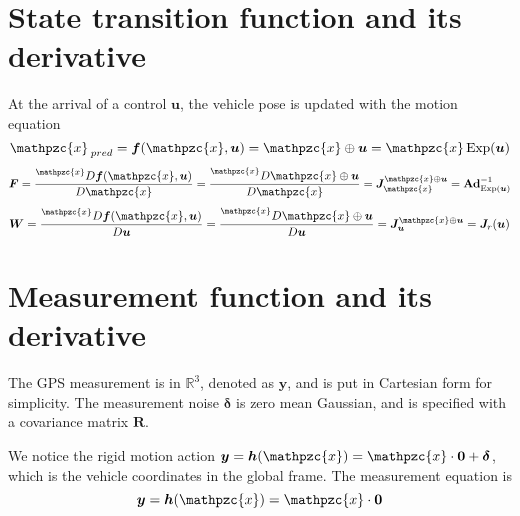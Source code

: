 \documentclass[12pt, a4paper]{article}
\DeclareMathOperator{\Exp}{Exp}
\begin{document}
\section{State transition function and its derivative}
At the arrival of a control $\bm{u}$, the vehicle pose is updated with the
motion equation
\[
  \mathpzc{x}_{\mkern4mu pred} = \bm{f}(\mathpzc{x}, \bm{u}) = \mathpzc{x}\oplus\bm{u}=
  \mathpzc{x}\Exp(\bm{u})
\]
\[
  \bm{F}=
  \frac{\prescript{\mathpzc{x}}{}{D}\bm{f}(\mathpzc{x},\bm{u})}{D\mathpzc{x}}=
  \frac{\prescript{\mathpzc{x}}{}{D\mathpzc{x}\oplus\bm{u}}}{D\mathpzc{x}}=
  \bm{J}^{\mathpzc{x}\oplus\bm{u}}_{\mathpzc{x}} =
  \textbf{Ad}_{\Exp(\bm{u})}^{-1}
\]
\[
  \bm{W}=
  \frac{\prescript{\mathpzc{x}}{}{D}\bm{f}(\mathpzc{x},\bm{u})}{D\bm{u}}=
  \frac{\prescript{\mathpzc{x}}{}{D\mathpzc{x}\oplus\bm{u}}}{D\bm{u}}=
  \bm{J}^{\mathpzc{x}\oplus\bm{u}}_{\bm{u}}=\bm{J}_{r}(\bm{u})
\]


\section{Measurement function and its derivative}
The GPS measurement is in $\mathbb{R}^{3}$, denoted as $\bm{y}$, and is put in
Cartesian form for simplicity. The measurement noise $\bm{\delta}$ is zero mean
Gaussian, and is specified with a covariance matrix $\bm{R}$.

We notice the rigid motion action $\bm{y}=\bm{h}(\mathpzc{x})=\mathpzc{x}\cdot
\bm{0}+\bm{\delta}$, which is the vehicle coordinates in the global frame. The
measurement equation is
\[
  \bm{y} = \bm{h}(\mathpzc{x}) = \mathpzc{x}\cdot\bm{0}
\]
\end{document}
